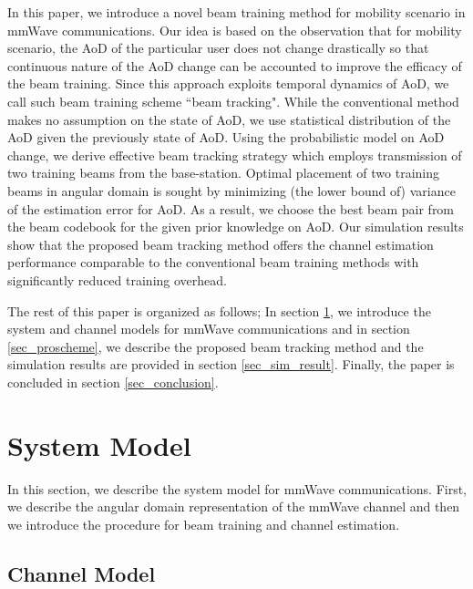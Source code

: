 \documentclass[conference]{IEEEtran}
\begin{document}
In this paper, we introduce a novel  beam training method  for mobility scenario in mmWave communications.
Our idea is based on the observation that for mobility scenario, the AoD of the particular user does not change drastically so that  continuous nature of the AoD change can be accounted to improve the efficacy of the beam training. Since this approach exploits temporal dynamics of AoD, we call such beam training scheme ``beam tracking".
While the conventional method makes no assumption on the state of AoD, we use statistical distribution of the AoD given the previously state of AoD. Using the probabilistic model on AoD change, we derive effective beam tracking strategy which employs transmission of two training beams from the base-station. Optimal  placement of two training beams in angular domain is sought by minimizing (the lower bound of) variance of the estimation error for AoD. As a result, we choose the best beam pair from the beam codebook for the given prior knowledge on AoD.
Our simulation results show that the proposed beam tracking method offers the channel estimation performance comparable to the conventional beam training methods with significantly reduced training overhead.

The rest of this paper is organized as follows;
In section \ref{sec_sys_model}, we introduce the system and channel models for mmWave communications and in section \ref{sec_proscheme}, we describe the proposed beam tracking method and the simulation results are provided in section \ref{sec_sim_result}. Finally, the paper is concluded in section \ref{sec_conclusion}.

\section{System Model} \label{sec_sys_model}

In this section, we describe the system model for mmWave communications. First, we describe the angular domain representation of the mmWave channel and then we introduce the procedure for beam training and channel estimation.

\subsection{Channel Model}
\end{document}
